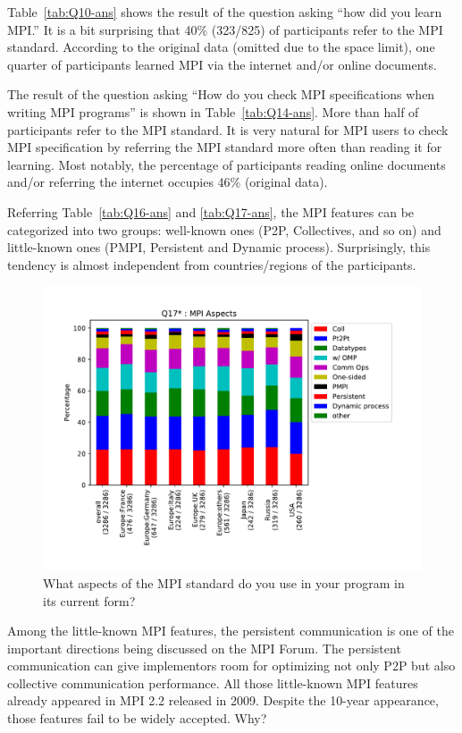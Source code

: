 \documentclass[sigconf,nonacm]{acmart}
\begin{document}
Table~\ref{tab:Q10-ans} shows the result of the question asking ``how
did you learn MPI.'' It is a bit surprising that 40\% (323/825) of
participants refer to the MPI standard. According to the original
data (omitted due to the space limit), one quarter of participants
learned MPI via the internet and/or online documents.

The result of the question asking ``How do you check MPI
specifications when writing MPI programs'' is shown in
Table~\ref{tab:Q14-ans}. More than half of participants refer to the
MPI standard. It is very natural for MPI users to check MPI
specification by referring the MPI standard more often than reading it
for learning. Most notably, the percentage of participants reading
online documents and/or referring the internet occupies 46\% (original
data).

Referring Table~\ref{tab:Q16-ans} and \ref{tab:Q17-ans}, the MPI
features can be categorized into two groups: well-known ones (P2P,
Collectives, and so on) and little-known ones (PMPI, Persistent and
Dynamic process). Surprisingly, this tendency is almost independent
from countries/regions of the participants.

\begin{figure}[bht]
\begin{center}
\includegraphics[width=0.8\hsize]{figs/Q17-S.pdf}
\caption{What aspects of the MPI standard do you use in your program in its current form?}%
\label{fig:Q17}
\end{center}
\end{figure}

Among the little-known MPI features, the persistent communication is
one of the important directions being discussed on the MPI Forum\cite{mpi-forum}.
The persistent communication can give implementors room for
optimizing not only P2P but also collective communication
performance.
All those little-known MPI features already appeared in MPI 2.2
released in 2009. Despite the 10-year appearance, those features
fail to be widely accepted.  Why?
\end{document}

